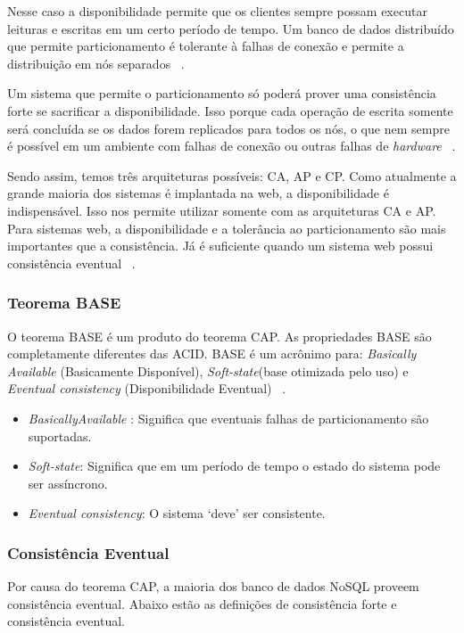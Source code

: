 Nesse caso a disponibilidade permite que os clientes sempre possam executar leituras e escritas em um certo período de tempo. Um banco de dados distribuído que permite particionamento é tolerante à falhas de conexão e permite a distribuição em nós separados ~\cite{Orendanalysisand}.

Um sistema que permite o particionamento só poderá prover uma consistência forte se sacrificar a disponibilidade. Isso porque cada operação de escrita somente será concluída se os dados forem replicados para todos os nós, o que nem sempre é possível em um ambiente com falhas de conexão ou outras falhas de \textit{hardware} ~\cite{Orendanalysisand}.

Sendo assim, temos três arquiteturas possíveis: CA, AP e CP. Como atualmente a grande maioria dos sistemas é implantada na web, a disponibilidade é indispensável. Isso nos permite utilizar somente com as arquiteturas CA e AP. Para sistemas web, a disponibilidade e a tolerância ao particionamento são mais importantes que a consistência. Já é suficiente quando um sistema web possui consistência eventual ~\cite{nosqlaplicassandra}.

\subsubsection{Teorema BASE}

O teorema BASE é um produto do teorema CAP. As propriedades BASE são completamente diferentes das ACID. BASE é um acrônimo para: \textit{Basically Available} (Basicamente Disponível), \textit{Soft-state}(base otimizada pelo uso) e \textit{Eventual consistency} (Disponibilidade Eventual) ~\cite{nosqlaplicassandra}.

\begin{itemize}
\item \textit{BasicallyAvailable} : Significa que eventuais falhas de particionamento são suportadas.
\item \textit{Soft-state}: Significa que em um período de tempo o estado do sistema pode ser assíncrono.
\item \textit{Eventual consistency}: O sistema ‘deve’ ser consistente.
\end{itemize}

\subsubsection{Consistência Eventual}

Por causa do teorema CAP, a maioria dos banco de dados NoSQL proveem consistência eventual. Abaixo estão as definições de consistência forte e consistência eventual.

